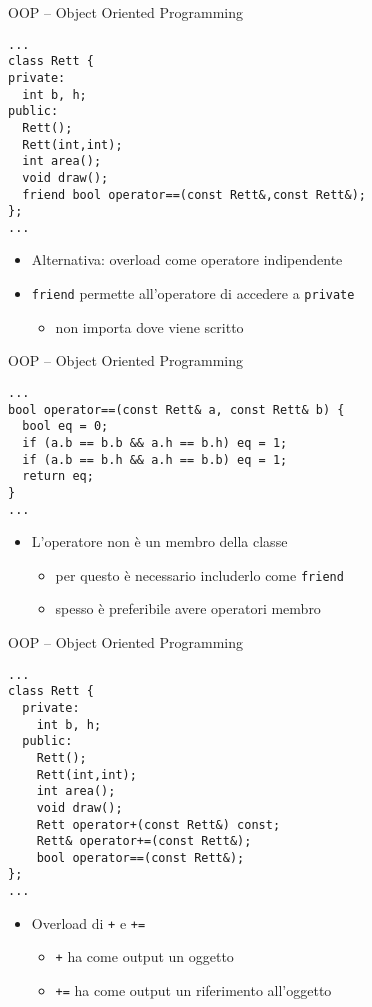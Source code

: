 \begin{frame}[fragile]{OOP -- Object Oriented Programming}
  \vfill
  \begin{lstlisting}[firstnumber=2]
...
class Rett {
private:
  int b, h;
public:
  Rett();
  Rett(int,int);
  int area();
  void draw();
  friend bool operator==(const Rett&,const Rett&);
};
...\end{lstlisting}
  \vfill
  \begin{itemize}
    \item Alternativa: overload come operatore indipendente
    \vfill
    \item \lstinline$friend$ permette all'operatore di accedere a \lstinline$private$
    \begin{itemize}
      \item non importa dove viene scritto
    \end{itemize}
  \end{itemize}
  \vfill
\end{frame}

\begin{frame}[fragile]{OOP -- Object Oriented Programming}
  \vfill
  \begin{lstlisting}[firstnumber=37]
...
bool operator==(const Rett& a, const Rett& b) {
  bool eq = 0;
  if (a.b == b.b && a.h == b.h) eq = 1;
  if (a.b == b.h && a.h == b.b) eq = 1;
  return eq;
}
...\end{lstlisting}
  \vfill
  \begin{itemize}
    \item L'operatore \alert{non} è un membro della classe
    \begin{itemize}
      \item per questo è necessario includerlo come \lstinline$friend$
      \item spesso è preferibile avere operatori membro
    \end{itemize}
  \end{itemize}
  \vfill
\end{frame}

\begin{frame}[fragile]{OOP -- Object Oriented Programming}
  \vfill
  \begin{lstlisting}[firstnumber=2]
...
class Rett {
  private:
    int b, h;
  public:
    Rett();
    Rett(int,int);
    int area();
    void draw();
    Rett operator+(const Rett&) const;
    Rett& operator+=(const Rett&);
    bool operator==(const Rett&);
};
...\end{lstlisting}
  \vfill
  \begin{itemize}
    \item Overload di \lstinline$+$ e \lstinline$+=$
    \begin{itemize}
      \item \lstinline$+$ ha come output un oggetto
      \item \lstinline$+=$ ha come output un riferimento all'oggetto
    \end{itemize}
  \end{itemize}
  \vfill
\end{frame}

